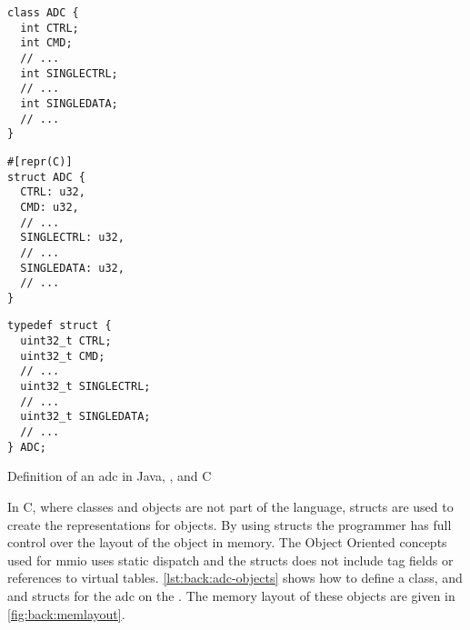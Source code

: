 \begin{listing}[H]
  \centering
  \begin{minipage}{0.31\textwidth}
  \begin{listing}
    \begin{verbatim}
class ADC {
  int CTRL;
  int CMD;
  // ...
  int SINGLECTRL;
  // ...
  int SINGLEDATA;
  // ...
}
    \end{verbatim}
  \end{listing}
  \end{minipage}
  \hfill
  \begin{minipage}{0.31\textwidth}
  \begin{listing}
    \begin{verbatim}
#[repr(C)]
struct ADC {
  CTRL: u32,
  CMD: u32,
  // ...
  SINGLECTRL: u32,
  // ...
  SINGLEDATA: u32,
  // ...
}
    \end{verbatim}
  \end{listing}
  \end{minipage}
  \hfill
  \begin{minipage}{0.31\textwidth}
  \begin{listing}
    \begin{verbatim}
typedef struct {
  uint32_t CTRL;
  uint32_t CMD;
  // ...
  uint32_t SINGLECTRL;
  // ...
  uint32_t SINGLEDATA;
  // ...
} ADC;
    \end{verbatim}
  \end{listing}
  \end{minipage}

  \caption{Definition of an \gls{adc} in Java, {\rust}, and C}
  \label{lst:back:adc-objects}
\end{listing}


In C, where classes and objects are not part of the language, structs are used to create the representations for objects.
By using structs the programmer has full control over the layout of the object in memory.
The Object Oriented concepts used for \gls{mmio} uses static dispatch and the structs does not include tag fields or references to virtual tables.
\autoref{lst:back:adc-objects} shows how to define a {\Java} class, and {\rust} and {\C} structs for the \gls{adc} on the {\gecko}.
The memory layout of these objects are given in \autoref{fig:back:memlayout}.

